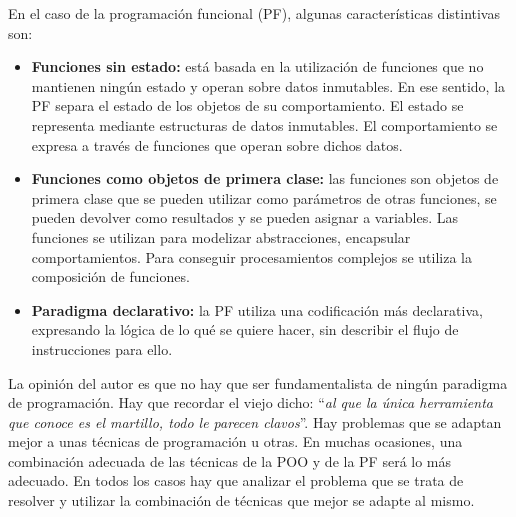 En el caso de la programación funcional (PF), algunas características distintivas son:
\begin{itemize}
   \item \textbf{Funciones sin estado:} está basada en la utilización de funciones que no mantienen ningún estado y operan sobre datos inmutables. En ese sentido, la PF separa el estado de los objetos de su comportamiento. El estado se representa mediante estructuras de datos inmutables. El comportamiento se expresa a través de funciones que operan sobre dichos datos.
   
   \vspace{0.5em}
   
   \item \textbf{Funciones como objetos de primera clase:} las funciones son objetos de primera clase que se pueden utilizar como parámetros de otras funciones, se pueden devolver como resultados y se pueden asignar a variables. Las funciones se utilizan para modelizar abstracciones, encapsular comportamientos. Para conseguir procesamientos complejos se utiliza la composición de funciones.
   
   \vspace{0.5em}

   \item \textbf{Paradigma declarativo:} la PF utiliza una codificación más declarativa, expresando la lógica de lo qué se quiere hacer, sin describir el flujo de instrucciones para ello. 
\end{itemize}

La opinión del autor es que no hay que ser fundamentalista de ningún paradigma de programación. Hay que recordar el viejo dicho: ``\textit{al que la única herramienta que conoce es el martillo, todo le parecen clavos}''. Hay problemas que se adaptan mejor a unas técnicas de programación u otras. En muchas ocasiones, una combinación adecuada de las técnicas de la POO y de la PF será lo más adecuado. En todos los casos hay que analizar el problema que se trata de resolver y utilizar la combinación de técnicas que mejor se adapte al mismo.

